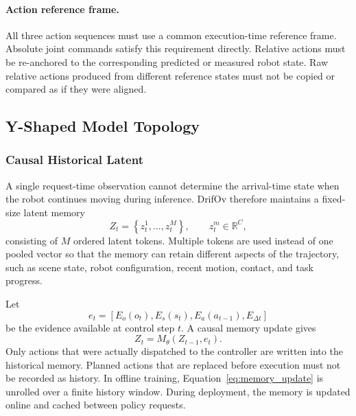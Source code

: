 \paragraph{Action reference frame.}
All three action sequences must use a common execution-time reference frame.
Absolute joint commands satisfy this requirement directly.  Relative actions
must be re-anchored to the corresponding predicted or measured robot state.
Raw relative actions produced from different reference states must not be
copied or compared as if they were aligned.

\subsection{Y-Shaped Model Topology}
\label{sec:y_topology}

\subsubsection{Causal Historical Latent}

A single request-time observation cannot determine the arrival-time state when
the robot continues moving during inference.  DrifOv therefore maintains a
fixed-size latent memory
\begin{equation}
    Z_t
    =
    \left\{
        z_t^1,\ldots,z_t^M
    \right\},
    \qquad
    z_t^m\in\mathbb{R}^{C},
    \label{eq:latent_memory}
\end{equation}
consisting of \(M\) ordered latent tokens.  Multiple tokens are used instead of
one pooled vector so that the memory can retain different aspects of the
trajectory, such as scene state, robot configuration, recent motion, contact,
and task progress.

Let
\begin{equation}
    e_t
    =
    \left[
        E_o(o_t),
        E_s(s_t),
        E_a(a_{t-1}),
        E_{\Delta t}
    \right]
\end{equation}
be the evidence available at control step \(t\).  A causal memory update gives
\begin{equation}
    Z_t
    =
    M_\theta(Z_{t-1},e_t).
    \label{eq:memory_update}
\end{equation}
Only actions that were actually dispatched to the controller are written into
the historical memory.  Planned actions that are replaced before execution
must not be recorded as history.  In offline training,
Equation~\eqref{eq:memory_update} is unrolled over a finite history window.  During
deployment, the memory is updated online and cached between policy requests.

